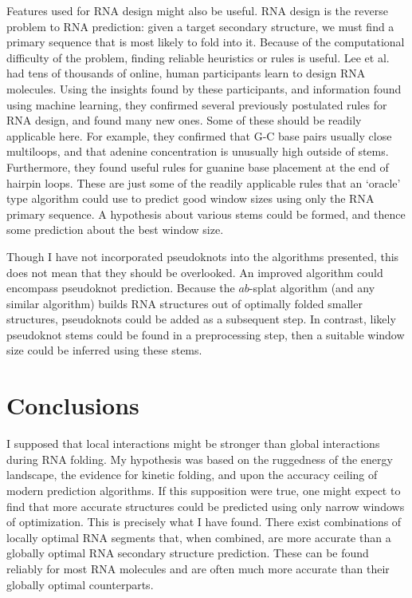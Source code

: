 \documentclass{cshonours}
\begin{document}
Features used for RNA design might also be useful. RNA design is the reverse problem to RNA prediction: given a target secondary structure, we must find a primary sequence that is most likely to fold into it. Because of the computational difficulty of the problem, finding reliable heuristics or rules is useful. Lee et al. \cite{lee2014rna} had tens of thousands of online, human participants learn to design RNA molecules. Using the insights found by these participants, and information found using machine learning, they confirmed several previously postulated rules for RNA design, and found many new ones. Some of these should be readily applicable here. For example, they confirmed that G-C base pairs usually close multiloops, and that adenine concentration is unusually high outside of stems. Furthermore, they found useful rules for guanine base placement at the end of hairpin loops. These are just some of the readily applicable rules that an `oracle' type algorithm could use to predict good window sizes using only the RNA primary sequence. A hypothesis about various stems could be formed, and thence some prediction about the best window size.

Though I have not incorporated pseudoknots into the algorithms presented, this does not mean that they should be overlooked. An improved algorithm could encompass pseudoknot prediction. Because the $ab$-splat algorithm (and any similar algorithm) builds RNA structures out of optimally folded smaller structures, pseudoknots could be added as a subsequent step. In contrast, likely pseudoknot stems could be found in a preprocessing step, then a suitable window size could be inferred using these stems.


\section{Conclusions}
I supposed that local interactions might be stronger than global interactions during RNA folding. My hypothesis was based on the ruggedness of the energy landscape, the evidence for kinetic folding, and upon the accuracy ceiling of modern prediction algorithms. If this supposition were true, one might expect to find that more accurate structures could be predicted using only narrow windows of optimization. This is precisely what I have found. There exist combinations of locally optimal RNA segments that, when combined, are more accurate than a globally optimal RNA secondary structure prediction. These can be found reliably for most RNA molecules and are often much more accurate than their globally optimal counterparts.
\end{document}
